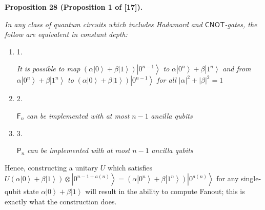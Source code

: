 

\par\medskip\noindent\textbf{
\textbf{Proposition 28}\textbf{ }(Proposition 1 of [17])\textbf{.}
}\par



\emph{In any class of quantum circuits which includes Hadamard and $\mathsf{CNOT}$-gates, the follow are equivalent in constant depth:}\par


\begin{enumerate}


\item[] 
1. 


\emph{It is possible to map }$(\alpha\left|0\right\rangle+\beta\left|1\right\rangle)\left|0^{n-1}\right\rangle$\emph{ to }$\alpha\left|0^{n}\right\rangle+\beta\left|1^{n}\right\rangle$\emph{ and from }$\alpha\left|0^{n}\right\rangle+\beta\left|1^{n}\right\rangle$\emph{ to }$(\alpha\left|0\right\rangle+\beta\left|1\right\rangle)\left|0^{n-1}\right\rangle$\emph{ for all }$|\alpha|^{2}+|\beta|^{2}=1$\emph{}\par





\item[] 
2. 


$\mathsf{F}_{n}$\emph{ can be implemented with at most }$n-1$\emph{ ancilla qubits}\par





\item[] 
3. 


${\mathsf{P}}_{n}$\emph{ can be implemented with at most }$n-1$\emph{ ancilla qubits}\par





\end{enumerate}






Hence, constructing a unitary $U$ which satisfies $U(\alpha\left|0\right\rangle+\beta\left|1\right\rangle)\otimes\left|0^{n-1+a(n)}\right\rangle=(\alpha\left|0^{n}\right\rangle+\beta\left|1^{n}\right\rangle)\left|0^{a(n)}\right\rangle$ for any single-qubit state $\alpha\left|0\right\rangle+\beta\left|1\right\rangle$ will result in the ability to compute Fanout; this is exactly what the construction does.\par




